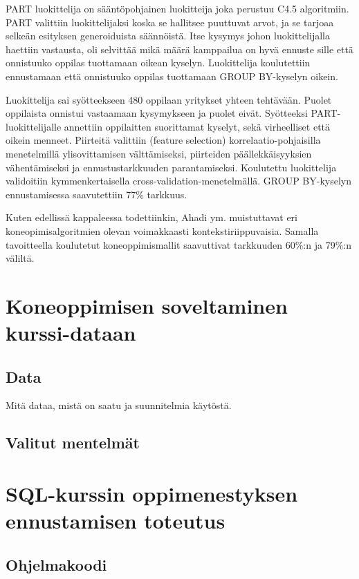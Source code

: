 \documentclass[finnish,twoside,openright]{HYgraduMLDS}
\begin{document}
PART luokittelija on sääntöpohjainen luokitteija joka perustuu C4.5 algoritmiin\cite{Ahadi:2016:SSM:2839509.2844640}. PART valittiin luokittelijaksi koska se hallitsee puuttuvat arvot, ja se tarjoaa selkeän esityksen generoiduista säännöistä. Itse kysymys johon luokittelijalla haettiin vastausta, oli selvittää mikä määrä kamppailua on hyvä ennuste sille että onnistuuko oppilas tuottamaan oikean kyselyn. Luokittelija koulutettiin ennustamaan että onnistuuko oppilas tuottamaan GROUP BY-kyselyn oikein.

Luokittelija sai syötteekseen 480 oppilaan yritykset yhteen tehtävään. Puolet oppilaista onnistui vastaamaan kysymykseen ja puolet eivät. Syötteeksi PART-luokittelijalle annettiin oppilaitten suorittamat kyselyt, sekä virheelliset että oikein menneet. Piirteitä valittiin (feature selection) korrelaatio-pohjaisilla menetelmillä ylisovittamisen välttämiseksi, piirteiden päällekkäisyyksien vähentämiseksi ja ennustustarkkuuden parantamiseksi. Koulutettu luokittelija validoitiin kymmenkertaisella cross-validation-menetelmällä. GROUP BY-kyselyn ennustamisessa saavutettiin 77\% tarkkuus.

Kuten edellissä kappaleessa todettiinkin, Ahadi ym. \cite{Ahadi:2016:SSM:2839509.2844640} muistuttavat eri koneopimisalgoritmien olevan voimakkaasti kontekstiriippuvaisia. Samalla tavoitteella koulutetut koneoppimismallit saavuttivat tarkkuuden 60\%:n ja 79\%:n väliltä.


\chapter{Koneoppimisen soveltaminen kurssi-dataan}

\section{Data}

Mitä dataa, mistä on saatu ja suunnitelmia käytöstä.


\section{Valitut mentelmät}


\chapter{SQL-kurssin oppimenestyksen ennustamisen toteutus}

\section{Ohjelmakoodi}
\end{document}
